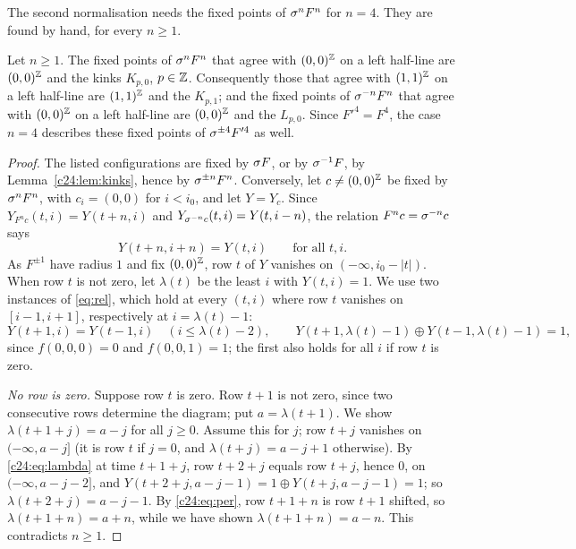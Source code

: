 The second normalisation needs the fixed points of $\sigma^nF^n$ for $n=4$. They are found by hand, for every $n\ge1$.

\begin{lemma}\label{c24:lem:fixn}
Let $n\ge1$. The fixed points of $\sigma^nF^n$ that agree with $(0,0)^{\mathbb{Z}}$ on a left half-line are $(0,0)^{\mathbb{Z}}$ and the kinks $K_{p,0}$, $p\in\mathbb{Z}$. Consequently those that agree with $(1,1)^{\mathbb{Z}}$ on a left half-line are $(1,1)^{\mathbb{Z}}$ and the $K_{p,1}$; and the fixed points of $\sigma^{-n}F^n$ that agree with $(0,0)^{\mathbb{Z}}$ on a left half-line are $(0,0)^{\mathbb{Z}}$ and the $L_{p,0}$. Since $F'^4=F^4$, the case $n=4$ describes these fixed points of $\sigma^{\pm4}F'^4$ as well.
\end{lemma}

\begin{proof}
The listed configurations are fixed by $\sigma F$, or by $\sigma^{-1}F$, by Lemma~\ref{c24:lem:kinks}, hence by $\sigma^{\pm n}F^n$. Conversely, let $c\ne(0,0)^{\mathbb{Z}}$ be fixed by $\sigma^nF^n$, with $c_i=(0,0)$ for $i<i_0$, and let $Y=Y_c$. Since $Y_{F^nc}(t,i)=Y(t+n,i)$ and $Y_{\sigma^{-n}c}(t,i)=Y(t,i-n)$, the relation $F^nc=\sigma^{-n}c$ says
\begin{equation}\label{c24:eq:per}
Y(t+n,i+n)=Y(t,i)\qquad\text{for all }t,i.
\end{equation}
As $F^{\pm1}$ have radius $1$ and fix $(0,0)^{\mathbb{Z}}$, row $t$ of $Y$ vanishes on $(-\infty,i_0-|t|)$. When row $t$ is not zero, let $\lambda(t)$ be the least $i$ with $Y(t,i)=1$. We use two instances of \eqref{eq:rel}, which hold at every $(t,i)$ where row $t$ vanishes on $[i-1,i+1]$, respectively at $i=\lambda(t)-1$:
\begin{equation}\label{c24:eq:lambda}
Y(t+1,i)=Y(t-1,i)\quad(i\le\lambda(t)-2),\qquad Y(t+1,\lambda(t)-1)\oplus Y(t-1,\lambda(t)-1)=1,
\end{equation}
since $f(0,0,0)=0$ and $f(0,0,1)=1$; the first also holds for all $i$ if row $t$ is zero.

\emph{No row is zero.} Suppose row $t$ is zero. Row $t+1$ is not zero, since two consecutive rows determine the diagram; put $a=\lambda(t+1)$. We show $\lambda(t+1+j)=a-j$ for all $j\ge0$. Assume this for $j$; row $t+j$ vanishes on $(-\infty,a-j]$ (it is row $t$ if $j=0$, and $\lambda(t+j)=a-j+1$ otherwise). By \eqref{c24:eq:lambda} at time $t+1+j$, row $t+2+j$ equals row $t+j$, hence $0$, on $(-\infty,a-j-2]$, and $Y(t+2+j,a-j-1)=1\oplus Y(t+j,a-j-1)=1$; so $\lambda(t+2+j)=a-j-1$. By \eqref{c24:eq:per}, row $t+1+n$ is row $t+1$ shifted, so $\lambda(t+1+n)=a+n$, while we have shown $\lambda(t+1+n)=a-n$. This contradicts $n\ge1$.


\end{proof}
